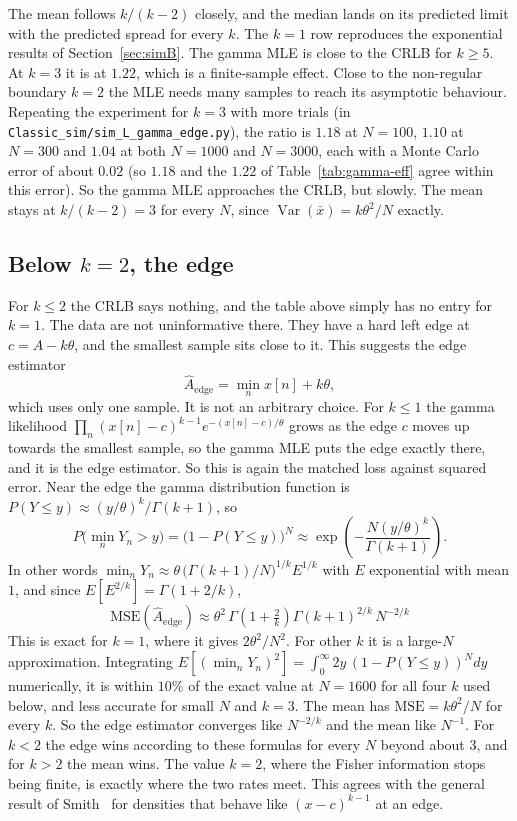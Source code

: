 \documentclass[11pt]{article}
\numberwithin{figure}{section}
\numberwithin{equation}{section}
\begin{document}
The mean follows $k/(k-2)$ closely, and the median lands on its predicted limit with the predicted
spread for every $k$. The $k = 1$ row reproduces the exponential results of Section~\ref{sec:simB}.
The gamma MLE is close to the CRLB for $k \geq 5$. At $k = 3$ it is at $1.22$, which is a
finite-sample effect. Close to the non-regular boundary $k = 2$ the MLE needs many samples to reach
its asymptotic behaviour. Repeating the experiment for $k = 3$ with more trials (in
\texttt{Classic\_sim/sim\_L\_gamma\_edge.py}), the ratio is $1.18$ at $N = 100$, $1.10$ at $N = 300$
and $1.04$ at both $N = 1000$ and $N = 3000$, each with a Monte Carlo error of about $0.02$ (so $1.18$ and the $1.22$ of
Table~\ref{tab:gamma-eff} agree within this error). So the gamma MLE approaches the CRLB, but slowly. The mean stays at $k/(k-2) = 3$ for every $N$, since
$\operatorname{Var}(\bar x) = k\theta^2/N$ exactly.

\subsection{Below $k = 2$, the edge}
\label{sec:gamma-edge}

For $k \leq 2$ the CRLB says nothing, and the table above simply has no entry for $k = 1$. The data
are not uninformative there. They have a hard left edge at $c = A - k\theta$, and the smallest sample
sits close to it. This suggests the edge estimator
\[
  \hat A_{\text{edge}} = \min_n x[n] + k\theta ,
\]
which uses only one sample. It is not an arbitrary choice. For $k \leq 1$ the gamma likelihood
$\prod_n (x[n] - c)^{k-1} e^{-(x[n] - c)/\theta}$ grows as the edge $c$ moves up towards the smallest
sample, so the gamma MLE puts the edge exactly there, and it is the edge estimator. So this is again
the matched loss against squared error. Near the edge the gamma distribution function is
$P(Y \leq y) \approx (y/\theta)^k / \Gamma(k+1)$, so
\[
  P\Big(\min_n Y_n > y\Big) = \big(1 - P(Y \leq y)\big)^N \approx
  \exp\!\left(-\frac{N (y/\theta)^k}{\Gamma(k+1)}\right).
\]
In other words $\min_n Y_n \approx \theta\,\big(\Gamma(k+1)/N\big)^{1/k} E^{1/k}$ with $E$ exponential with
mean $1$, and since $E[E^{2/k}] = \Gamma(1 + 2/k)$,
\[
  \boxed{\text{MSE}(\hat A_{\text{edge}}) \approx \theta^2\,\Gamma\!\left(1 + \tfrac{2}{k}\right)
  \Gamma(k+1)^{2/k}\, N^{-2/k}}
\]
This is exact for $k = 1$, where it gives $2\theta^2/N^2$. For other $k$ it is a large-$N$ approximation. Integrating $E[(\min_n Y_n)^2] = \int_0^\infty 2y\,(1 - P(Y \leq y))^N dy$ numerically, it is within $10\%$ of the exact value at $N = 1600$ for all four $k$ used below, and less accurate for small $N$ and $k = 3$. The mean has $\text{MSE} = k\theta^2/N$ for
every $k$. So the edge estimator converges like $N^{-2/k}$ and the mean like $N^{-1}$. For $k < 2$ the
edge wins according to these formulas for every $N$ beyond about $3$, and for $k > 2$ the mean wins. The value $k = 2$, where the
Fisher information stops being finite, is exactly where the two rates meet. This agrees with the
general result of Smith~\cite{smith} for densities that behave like $(x - c)^{k-1}$ at an edge.
\end{document}
